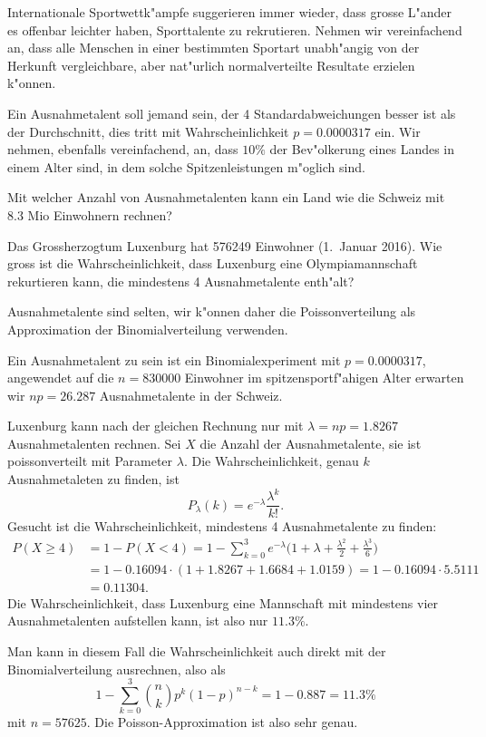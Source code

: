 Internationale Sportwettk"ampfe suggerieren immer wieder, dass grosse
L"ander es offenbar leichter haben, Sporttalente zu rekrutieren.
Nehmen wir vereinfachend an, dass alle Menschen in einer
bestimmten Sportart unabh"angig von der Herkunft vergleichbare,
aber nat"urlich normalverteilte Resultate erzielen k"onnen.

Ein Ausnahmetalent soll jemand sein, der 4 Standardabweichungen besser ist
als der Durchschnitt, dies tritt mit Wahrscheinlichkeit $p = 0.0000317$ ein.
Wir nehmen, ebenfalls vereinfachend, an, dass $10\%$ der Bev"olkerung
eines Landes in einem Alter sind, in dem solche Spitzenleistungen
m"oglich sind.
\begin{teilaufgaben}
\item
Mit welcher Anzahl von Ausnahmetalenten kann ein Land wie die Schweiz mit 
8.3 Mio Einwohnern rechnen?
\item
Das Grossherzogtum Luxenburg hat 576249 Einwohner (1.~Januar 2016).
Wie gross ist die Wahrscheinlichkeit, dass Luxenburg eine Olympiamannschaft
rekurtieren kann, die mindestens 4 Ausnahmetalente enth"alt?
\end{teilaufgaben}

\begin{loesung}
Ausnahmetalente sind selten, wir k"onnen daher die Poissonverteilung als
Approximation der Binomialverteilung verwenden.
\begin{teilaufgaben}
\item
Ein Ausnahmetalent zu sein ist ein Binomialexperiment mit $p=0.0000317$,
angewendet auf die $n=830000$ Einwohner im spitzensportf"ahigen Alter
erwarten wir $np=26.287$ Ausnahmetalente in der Schweiz.
\item
Luxenburg kann nach der gleichen Rechnung nur mit $\lambda=np=1.8267$
Ausnahmetalenten rechnen.
Sei $X$ die Anzahl der Ausnahmetalente, sie ist poissonverteilt mit
Parameter $\lambda$.
Die Wahrscheinlichkeit, genau $k$ Ausnahmetaleten zu finden, ist
\[
P_\lambda(k)=e^{-\lambda}\frac{\lambda^k}{k!}.
\]
Gesucht ist die Wahrscheinlichkeit, mindestens 4 Ausnahmetalente zu finden:
\begin{align*}
P(X \ge 4)
&=
1-P(X<4)=1-\sum_{k=0}^3 e^{-\lambda}\biggl(
1+\lambda+ \frac{\lambda^2}{2} + \frac{\lambda^3}{6}
\biggr)
\\
&=
1-0.16094\cdot(1+1.8267+1.6684+1.0159)
=
1-0.16094\cdot 5.5111\\
&=
0.11304.
\end{align*}
Die Wahrscheinlichkeit, dass Luxenburg eine Mannschaft mit mindestens
vier Ausnahmetalenten aufstellen kann, ist also nur $11.3\%$.

Man kann in diesem Fall die Wahrscheinlichkeit auch direkt mit der
Binomialverteilung ausrechnen, also als
\[
1-\sum_{k=0}^3\binom{n}{k}p^k(1-p)^{n-k}
=
1-0.887 = 11.3\%
\]
mit $n=57625$.
Die Poisson-Approximation ist also sehr genau.
\qedhere
\end{teilaufgaben}
\end{loesung}

